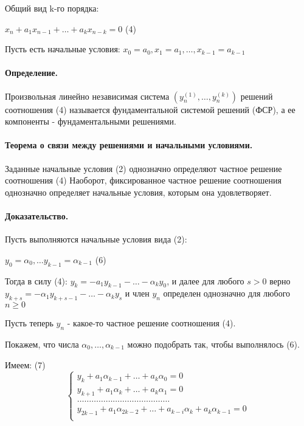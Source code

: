 \documentclass{report}
\begin{document}
Общий вид k-го порядка:

$x_{n}+a_1x_{n-1}+\ldots+a_{k}x_{n-k} = 0$ (4)

Пусть есть начальные условия:
$x_0=a_0, x_1=a_1,\ldots,x_{k-1}=a_{k-1}$

\paragraph*{Определение.}
Произвольная линейно независимая система $(y^{(1)}_{n},\ldots,y^{(k)}_{n})$ решений
соотношения (4) называется фундаментальной системой решений (ФСР), а ее компоненты -
фундаментальными решениями.

\paragraph*{Теорема о связи между решениями и начальными условиями.}
Заданные начальные условия (2) однозначно
определяют частное решение соотношения (4)
Наоборот, фиксированное частное решение соотношения однозначно определяет
начальные условия, которым она удовлетворяет.

\paragraph*{Доказательство.}
Пусть выполняются начальные условия вида (2):

$y_0=\alpha_0,\ldots y_{k-1}=\alpha_{k-1}$ (6)

Тогда в силу (4):
$y_{k}=-a_1y_{k-1} - \ldots - \alpha_{k}y_{0}$, и далее для любого $s > 0$
верно  $y_{k+s} = -\alpha_1y_{k+s-1} - \ldots - \alpha_{k}y_{s}$ и член
$y_{n}$ определен однозначно для любого $n\ge 0$

Пусть теперь $y_{n}$ - какое-то частное решение соотношения (4).

Покажем, что числа $\alpha_0,\ldots,\alpha_{k-1}$ можно подобрать так, чтобы
выполнялось (6).

Имеем: (7)
\[
\begin{cases}
	y_{k} + a_1\alpha_{k-1} + \ldots + a_{k}\alpha_0 = 0\\
	y_{k+1} + a_1\alpha_{k} + \ldots + a_{k}\alpha_1 = 0\\
	\ldots\ldots\ldots\ldots\ldots\ldots\ldots\ldots\ldots\ldots\ldots\ldots\ldots\\
	y_{2k-1} + a_1\alpha_{2k-2} + \ldots + a_{k-i}\alpha_{k} + a_{k}\alpha_{k-1} = 0\\
\end{cases}
\]
\end{document}
